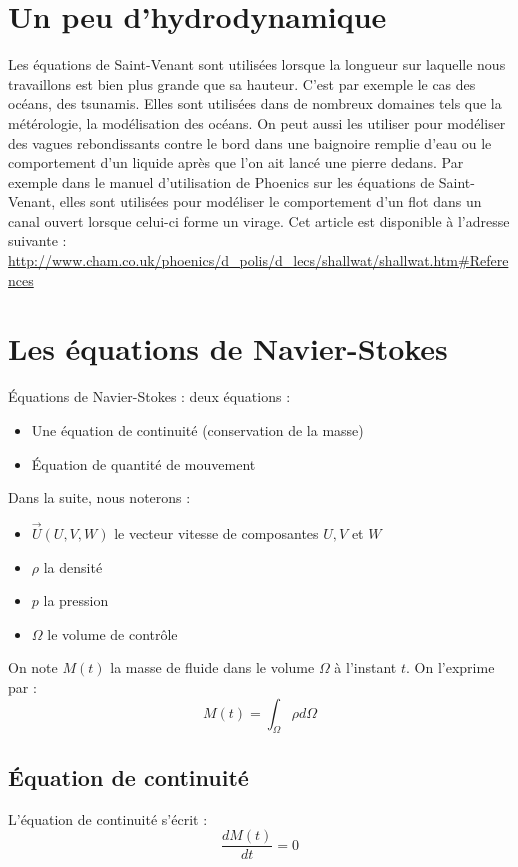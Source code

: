 
\section{Un peu d'hydrodynamique}
Les équations de Saint-Venant sont utilisées lorsque la longueur sur laquelle nous travaillons est bien plus grande que sa hauteur. C'est par exemple le cas des océans, des tsunamis. Elles sont utilisées dans de nombreux domaines tels que la métérologie, la modélisation des océans. On peut aussi les utiliser pour modéliser des vagues rebondissants contre le bord dans une baignoire remplie d'eau ou le comportement d'un liquide après que l'on ait lancé une pierre dedans. Par exemple dans le manuel d'utilisation de Phoenics sur les équations de Saint-Venant, elles sont utilisées pour modéliser le comportement d'un flot dans un canal ouvert lorsque celui-ci forme un virage. Cet article est disponible à l'adresse suivante : \url{http://www.cham.co.uk/phoenics/d_polis/d_lecs/shallwat/shallwat.htm#References} \\
\section{Les équations de Navier-Stokes}
Équations de Navier-Stokes : deux équations :
\begin{itemize}
	\item Une équation de continuité (conservation de la masse)
	\item Équation de quantité de mouvement
\end{itemize}

\bigskip
Dans la suite, nous noterons :
\begin{itemize}
	\item $\overrightarrow{U}(U,V,W)$ le vecteur vitesse de composantes $U, V$ et $W$
	\item $\rho$ la densité
	\item $p$ la pression
	\item $\Omega$ le volume de contrôle
\end{itemize}

\bigskip
On note $M(t)$ la masse de fluide dans le volume $\Omega$ à l'instant $t$. On l'exprime par :
	\begin{equation} \label{II-2} M(t)=\int_{\Omega} \rho d\Omega \end{equation}

	\subsection{Équation de continuité}
L'équation de continuité s'écrit :
	\begin{equation} \label{II-2-1-1} \frac{d M(t)}{dt}=0 \end{equation}

